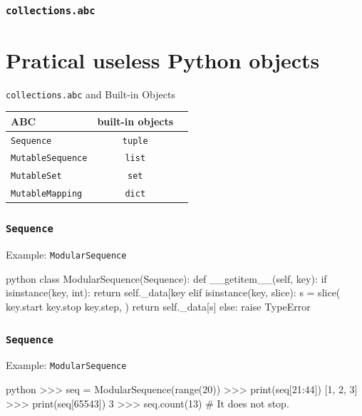 \documentclass[aspectratio=169,dvipdfmx,12pt,notheorems]{beamer}
\theoremstyle{definition}
\begin{document}
\begin{frame}\frametitle{\texttt{collections.abc}}

\section{Pratical useless Python objects}

\begin{exampleblock}{\texttt{collections.abc} and Built-in Objects}
\begin{table}[h]
\centering
\begin{tabular}{lcr}
\hline
ABC  & built-in objects \\
\hline
\texttt{Sequence}  & \texttt{tuple} \\
\texttt{MutableSequence}  & \texttt{list} \\
\texttt{MutableSet}  &  \texttt{set} \\
\texttt{MutableMapping}  & \texttt{dict}  \\
\hline
\end{tabular}
\end{table}
\end{exampleblock}

\end{frame}

\begin{frame}[fragile,shrink=10]\frametitle{\texttt{Sequence}}

\begin{exampleblock}{Example: \texttt{ModularSequence}}
\begin{pygments}{python}
class ModularSequence(Sequence):
    def __getitem__(self, key):
        if isinstance(key, int):
            return self._data[key %
        elif isinstance(key, slice):
            s = slice(
                key.start %
                key.stop %
                key.step,
            )
            return self._data[s]
        else:
            raise TypeError
\end{pygments}
\end{exampleblock}

\end{frame}

\begin{frame}[fragile]\frametitle{\texttt{Sequence}}

\begin{exampleblock}{Example: \texttt{ModularSequence}}
\begin{pygments}{python}
>>> seq = ModularSequence(range(20))
>>> print(seq[21:44])
[1, 2, 3]
>>> print(seq[65543])
3
>>> seq.count(13) # It does not stop.
\end{pygments}
\end{exampleblock}

\end{frame}
\end{document}
